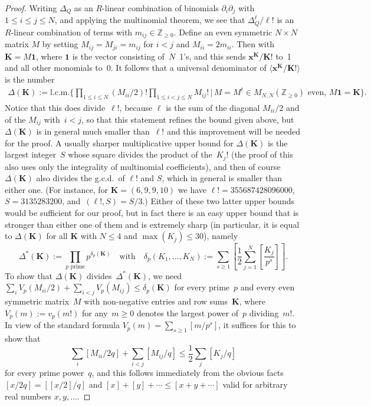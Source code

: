 \documentclass[pdftex]{sigma}
\numberwithin{equation}{section}
\def\D{\Delta}
\def\pt{\partial}
\def\Z{\mathbb Z}
\newcommand{\mb}{\mathbf}
\def\bK{\mathbf K}
\def\bx{\mathbf x}
\begin{document}
\begin{proof}
Writing $\D_Q$ as an $R$-linear combination of binomials $\pt_i\pt_j$ with
$1\le i\le j\le N$, and applying the multinomial theorem, we see that
$\D_Q^\ell/\ell!$ is an $R$-linear combination of terms
\smash{$\prod_{i\le j}(\pt_i\pt_j)^{m_{ij}}/m_{ij}!$} with $m_{ij}\in\Z_{\ge0}$. Define an even
symmetric $N\times N$ matrix $M$ by setting $M_{ij}=M_{ji}=m_{ij}$ for $i<j$ and
$M_{ii}=2 m_{ii}$. Then \smash{$\prod_{i\le j}(\pt_i\pt_j)^{m_{ij}}=\prod_j\pt_j^{K_j}$}
with $\bK=M\mb1$, where $\mb1$ is the vector consisting of~$N$~1's, and this
sends $\bx^\bK/\bK!$ to~1 and all other monomials to~0.
It follows that a universal denominator of $\big\langle\bx^\bK/\bK! \big\rangle$ is
the number
\begin{align*}
\D(\bK) := \text{l.c.m.}\Biggl\{ \prod_{1\le i\le N}(M_{ii}/2)!\prod_{1\le i<j\le N}M_{ij}!
 \,\Big|\, \text{$M=M^t\in M_{N,N}(\Z_{\ge0})$ even, $M\mb1=\bK$}\Biggr\} .
\end{align*}
Notice that this does divide~$\ell!$, because $\ell$ is the sum of the diagonal
$M_{ii}/2$ and of the $M_{ij}$ with~${i<j}$, so that this statement refines the bound
given above, but $\D(\bK)$ is in general much smaller than~$\ell!$ and this
improvement will be needed for the proof. A usually sharper multiplicative upper
bound for $\D(\bK)$ is the largest integer~$S$ whose square divides the product of
the~$K_j!$ (the proof of this also uses only the integrality of multinomial
coefficients), and then of course~$\D(\bK)$ also divides the g.c.d.\ of $\ell!$ and
$S$, which in general is smaller than either one. (For instance, for $\bK=(6,9,9,10)$
we have $\ell!=355687428096000$, $S=3135283200$, and~${(\ell!,S)=S/3}$.)
Either of these two latter upper bounds would be sufficient for our proof, but in
fact there is an easy upper bound that is stronger than either one of them and is
extremely sharp (in particular, it
is equal to $\D(\bK)$ for all $\bK$ with $N\le4$ and $\max(K_j)\le 30$), namely
\[
\D^*(\bK) := \prod_{\text{$p$ prime}} p^{\delta_p(\bK)} \quad \text{with} \quad
\delta_p(K_1,\dots,K_N) := \sum_{s\ge1}
\left[\frac12\sum_{j=1}^N\left[\frac{K_j}{p^s}\right]\right] .
\]
To show that $\D(\bK)$ divides~$\D^*(\bK)$, we need
$\sum_iV_p(M_{ii}/2)+\sum_{i<j}V_p(M_{ij})\le\delta_p(\bK)$ for every prime~$p$ and
every even symmetric matrix~$M$ with non-negative entries and row sums~$\bK$, where~${V_p(m):=v_p(m!)}$ for any~$m\ge0$ denotes the largest power of~$p$ dividing~$m!$.
In view of the standard formula $V_p(m)=\sum_{s\ge1}[m/p^s]$, it suffices for this
to show that
\[\sum_i[M_{ii}/2q]+\sum_{i<j}[M_{ij}/q]\le\frac12\sum_j[K_j/q]\]
for every prime power~$q$, and this follows immediately from the obvious facts
$[x/2q]=[[x/2]/q]$ and $[x]+[y]+\cdots \le[x+y+\cdots]$ valid for arbitrary real
numbers $x, y,\dots$.


\end{proof}
\end{document}
